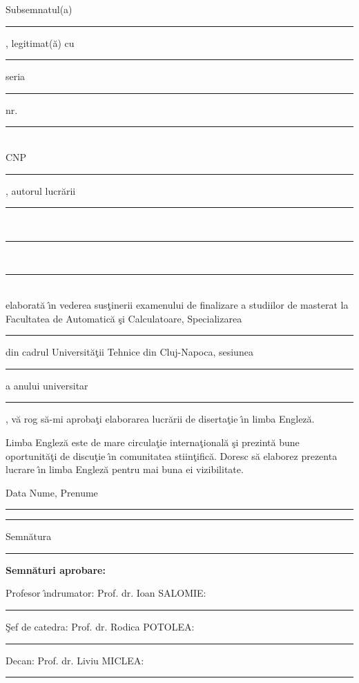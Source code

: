 \documentclass[12pt,a4paper,twoside]{report}
\newcommand{\uline}[1]{\rule[0pt]{#1}{0.4pt}}
\begin{document}
Subsemnatul(a) \\
\uline{14.8cm}, 
legitimat(\u{a}) cu \uline{4cm} seria \uline{3cm} nr. \uline{4cm}\\
CNP \uline{9cm}, autorul lucr\u{a}rii \uline{2.8cm}\\
\uline{16cm}\\
\uline{16cm}\\
elaborat\u{a} \^{\i}n vederea sus\c{t}inerii examenului de finalizare a studiilor de masterat la Facultatea de Automatic\u{a} \c{s}i Calculatoare, Specializarea \uline{7cm} din cadrul Universit\u{a}\c{t}ii Tehnice din Cluj-Napoca, sesiunea \uline{4cm} a anului universitar \uline{3cm}, v\u{a} rog s\u{a}-mi aproba\c{t}i elaborarea lucr\u{a}rii de diserta\c{t}ie \^{\i}n limba Englez\u{a}.

Limba Englez\u{a} este de mare circula\c{t}ie interna\c{t}ional\u{a} \c{s}i prezint\u{a} bune oportunit\u{a}\c{t}i de discu\c{t}ie \^{\i}n comunitatea stiin\c{t}ific\u{a}. Doresc s\u{a} elaborez prezenta lucrare \^{\i}n limba Englez\u{a} pentru mai buna ei vizibilitate.

\vspace{0.5cm}

Data \hspace{8cm} Nume, Prenume

\vspace{0.5cm}

\uline{3cm} \hspace{5cm} \uline{5cm}

\vspace{0.5cm}
\hspace{9.4cm}Semn\u{a}tura

\vspace{0.5cm}
\hspace{8cm} \uline{5cm}

\vspace{0.5cm}
\textbf{Semn\u{a}turi aprobare:}

Profesor \^{\i}ndrumator: Prof. dr. Ioan SALOMIE: \uline{5cm}

\vspace{0.5cm}

\c{S}ef de catedra: Prof. dr. Rodica POTOLEA: \uline{5cm}

\vspace{0.5cm}

Decan: Prof. dr. Liviu MICLEA: \uline{5cm}

\newpage


\end{document}
